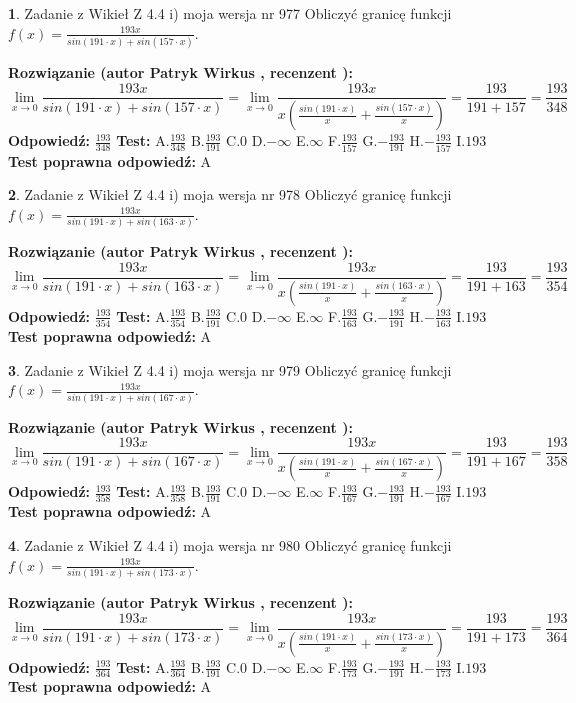 \documentclass[12pt, a4paper]{article}
\theoremstyle{definition} %
\newtheorem{zad}{}
\newcommand{\zadStart}[1]{\begin{zad}#1\newline}
\newcommand{\zadStop}{\end{zad}}
\newcommand{\rozwStart}[2]{\noindent \textbf{Rozwiązanie (autor #1 , recenzent #2): }\newline}
\newcommand{\rozwStop}{\newline}
\newcommand{\odpStart}{\noindent \textbf{Odpowiedź:}\newline}
\newcommand{\odpStop}{\newline}
\newcommand{\testStart}{\noindent \textbf{Test:}\newline}
\newcommand{\testStop}{\newline}
\newcommand{\kluczStart}{\noindent \textbf{Test poprawna odpowiedź:}\newline}
\newcommand{\kluczStop}{\newline}
\begin{document}
\zadStart{Zadanie z Wikieł Z 4.4 i) moja wersja nr 977}
Obliczyć granicę funkcji $f(x)=\frac{193x}{sin(191\cdot x) +sin(157\cdot x)}$.
\zadStop
\rozwStart{Patryk Wirkus}{}
$$\lim\limits_{x\to 0}\frac{193x}{sin(191\cdot x) +sin(157\cdot x)}=\lim\limits_{x\to 0}\frac{193x}{x(\frac{sin(191\cdot x)}{x}+\frac{sin(157\cdot x)}{x})}=\frac{193}{191+157} = \frac{193}{348}$$
\rozwStop
\odpStart
$\frac{193}{348}$
\odpStop
\testStart
A.$\frac{193}{348}$
B.$\frac{193}{191}$
C.$0$
D.$-\infty$
E.$\infty$
F.$\frac{193}{157}$
G.$-\frac{193}{191}$
H.$-\frac{193}{157}$
I.$193$
\testStop
\kluczStart
A
\kluczStop



\zadStart{Zadanie z Wikieł Z 4.4 i) moja wersja nr 978}
Obliczyć granicę funkcji $f(x)=\frac{193x}{sin(191\cdot x) +sin(163\cdot x)}$.
\zadStop
\rozwStart{Patryk Wirkus}{}
$$\lim\limits_{x\to 0}\frac{193x}{sin(191\cdot x) +sin(163\cdot x)}=\lim\limits_{x\to 0}\frac{193x}{x(\frac{sin(191\cdot x)}{x}+\frac{sin(163\cdot x)}{x})}=\frac{193}{191+163} = \frac{193}{354}$$
\rozwStop
\odpStart
$\frac{193}{354}$
\odpStop
\testStart
A.$\frac{193}{354}$
B.$\frac{193}{191}$
C.$0$
D.$-\infty$
E.$\infty$
F.$\frac{193}{163}$
G.$-\frac{193}{191}$
H.$-\frac{193}{163}$
I.$193$
\testStop
\kluczStart
A
\kluczStop



\zadStart{Zadanie z Wikieł Z 4.4 i) moja wersja nr 979}
Obliczyć granicę funkcji $f(x)=\frac{193x}{sin(191\cdot x) +sin(167\cdot x)}$.
\zadStop
\rozwStart{Patryk Wirkus}{}
$$\lim\limits_{x\to 0}\frac{193x}{sin(191\cdot x) +sin(167\cdot x)}=\lim\limits_{x\to 0}\frac{193x}{x(\frac{sin(191\cdot x)}{x}+\frac{sin(167\cdot x)}{x})}=\frac{193}{191+167} = \frac{193}{358}$$
\rozwStop
\odpStart
$\frac{193}{358}$
\odpStop
\testStart
A.$\frac{193}{358}$
B.$\frac{193}{191}$
C.$0$
D.$-\infty$
E.$\infty$
F.$\frac{193}{167}$
G.$-\frac{193}{191}$
H.$-\frac{193}{167}$
I.$193$
\testStop
\kluczStart
A
\kluczStop



\zadStart{Zadanie z Wikieł Z 4.4 i) moja wersja nr 980}
Obliczyć granicę funkcji $f(x)=\frac{193x}{sin(191\cdot x) +sin(173\cdot x)}$.
\zadStop
\rozwStart{Patryk Wirkus}{}
$$\lim\limits_{x\to 0}\frac{193x}{sin(191\cdot x) +sin(173\cdot x)}=\lim\limits_{x\to 0}\frac{193x}{x(\frac{sin(191\cdot x)}{x}+\frac{sin(173\cdot x)}{x})}=\frac{193}{191+173} = \frac{193}{364}$$
\rozwStop
\odpStart
$\frac{193}{364}$
\odpStop
\testStart
A.$\frac{193}{364}$
B.$\frac{193}{191}$
C.$0$
D.$-\infty$
E.$\infty$
F.$\frac{193}{173}$
G.$-\frac{193}{191}$
H.$-\frac{193}{173}$
I.$193$
\testStop
\kluczStart
A
\kluczStop
\end{document}
